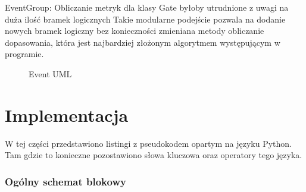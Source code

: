 EventGroup:
Obliczanie metryk dla klasy Gate byłoby utrudnione z uwagi na duża ilość bramek logicznych 
Takie modularne podejście pozwala na dodanie nowych bramek logiczny bez konieczności zmieniana metody obliczanie dopasowania, która jest najbardziej złożonym algorytmem występującym w programie. 
\begin{figure}[h]
	\caption{\label{fig:subcaption_example}Event UML}
\end{figure}

\clearpage
\section{Implementacja}

W tej części przedstawiono listingi z pseudokodem opartym na języku Python. Tam gdzie to konieczne pozostawiono słowa kluczowa oraz operatory tego języka.
\subsubsection{Ogólny schemat blokowy}


